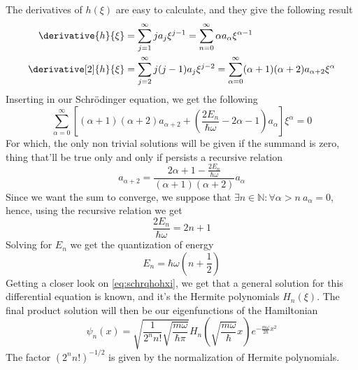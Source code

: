 \documentclass[a4paper, 11pt]{book}
\newcommand{\1}{\opr{\mathds{1}}}
\theoremstyle{plain}
\begin{document}
	The derivatives of $h(\xi)$ are easy to calculate, and they give the following result
	\begin{equation*}
		\begin{aligned}
			\derivative{h}{\xi}&=\sum_{j=1}^{\infty}ja_j\xi^{j-1}=\sum_{n=0}^{\infty}\alpha a_{\alpha}\xi^{\alpha-1}\\
			\derivative[2]{h}{\xi}&=\sum_{j=2}^{\infty}j(j-1)a_j\xi^{j-2}=\sum_{\alpha=0}^{\infty}(\alpha+1)(\alpha+2)a_{\alpha+2}\xi^{\alpha}
		\end{aligned}
	\end{equation*}
	Inserting in our Schrödinger equation, we get the following
	\begin{equation*}
		\sum_{\alpha=0}^{\infty}\left[ (\alpha+1)(\alpha+2)a_{\alpha+2}+\left( \frac{2E_n}{\hbar\omega}-2\alpha-1 \right)a_{\alpha} \right]\xi^{\alpha}=0
	\end{equation*}
	For which, the only non trivial solutions will be given if the summand is zero, thing that'll be true only and only if persists a recursive relation
	\begin{equation}
		a_{\alpha+2}=\frac{2\alpha+1-\frac{2E_n}{\hbar\omega}}{(\alpha+1)(\alpha+2)}a_{\alpha}
		\label{eq:recrelation}
	\end{equation}
	Since we want the sum to converge, we suppose that $\exists n\in\mathbb{N}:\forall \alpha>n\ a_{\alpha}=0$, hence, using the recursive relation we get
	\begin{equation}
		\frac{2E_n}{\hbar\omega}=2n+1
		\label{eq:energyquant}
	\end{equation}
	Solving for $E_n$ we get the quantization of energy
	\begin{equation}
		E_n=\hbar\omega\left( n+\frac{1}{2} \right)
		\label{eq:energyquantschrqho}
	\end{equation}
	Getting a closer look on \eqref{eq:schrqhohxi}, we get that a general solution for this differential equation is known, and it's the Hermite polynomials $H_n(\xi)$. The final product solution will then be our eigenfunctions of the Hamiltonian
	\begin{equation}
		\psi_{n}(x)=\sqrt{\frac{1}{2^nn!}\sqrt{\frac{m\omega}{\hbar\pi}}}H_n\left( \sqrt{\frac{m\omega}{\hbar}}x \right)e^{-\frac{m\omega}{2\hbar}x^2}
		\label{eq:finalsolutionschrqho}
	\end{equation}
	The factor $(2^nn!)^{-1/2}$ is given by the normalization of Hermite polynomials.
\end{document}
